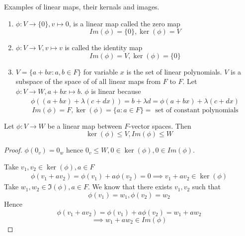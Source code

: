 \begin{example}     
    Examples of linear maps, their kernals and images. 
    \begin{enumerate}
        \item $\phi: V \to \{ 0 \} , v \mapsto 0$, is a linear map called the zero map
        \[
            Im(\phi) = \{ 0 \} , \ker(\phi) = V
        \]
        \item $\phi: V \to V, v \mapsto v$ is called the identity map 
        \[
        Im(\phi) = V, \ker(\phi) = \{ 0 \} 
        \]
        \item $V = \{ a + bx: a, b \in F \} $ for variable $x$ is the set of linear polynomials. $V$ is a subspace of the space of of all linear maps from $F$  to $F$. Let $\phi: V \to W, a + bx \mapsto b$. 
        $\phi$ is linear because 
        \begin{align*}
            \phi((a + bx) + \lambda (c + dx)) = b + \lambda d = \phi(a + bx) + \lambda(c + dx)
        \end{align*}
        \[
            Im(\phi) = F, \ker(\phi) = \{ a :a \in F \}  = \text{ set of constant polynomials}
        \]
    \end{enumerate}
\end{example}       

\begin{proposition}
    Let $\phi: V \to W$ be a linear map between $F$-vector spaces. Then 
    \[
        \ker(\phi) \leq V, Im(\phi) \leq W
    \]
\end{proposition}

\begin{proof}

    $\phi(0_v) = 0_w$ hence $0_v \leq W,  0 \in \ker(\phi), 0 \in Im(\phi)$. 

    Take $v_1, v_2 \in \ker(\phi), a \in F$
    \begin{align*}
        \phi(v_1 + av_2 ) = \phi(v_1) + a \phi(v_2) = 0 \implies v_1 + a v_2 \in \ker(\phi)
    \end{align*}
    Take $w_1, w_2 \in \Im(\phi), a \in F$. We know that there exists $v_1, v_2$ such that 
    \[
        \phi(v_1) = w_1, 
        \phi(v_2) = w_2 
    \]
    Hence \[
        \phi(v_1 + av_2) = \phi(v_1) + a \phi(v_2) = w_1 + aw_2
    \]
    \[
        \implies w_1 + aw_2 \in Im(\phi)
    \]
\end{proof}















\newpage







